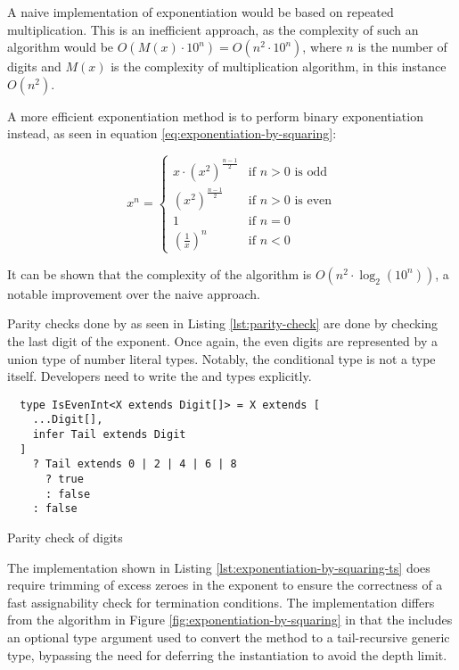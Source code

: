 A naive implementation of exponentiation would be based on repeated multiplication. This is an inefficient approach, as the complexity of such an algorithm would be $O(M(x) \cdot 10^n) = O(n^2 \cdot 10^n)$, where $n$ is the number of digits and $M(x)$ is the complexity of multiplication algorithm, in this instance $O(n^2)$.

A more efficient exponentiation method is to perform binary exponentiation instead, as seen in equation \ref{eq:exponentiation-by-squaring}:

\begin{equation}\label{eq:exponentiation-by-squaring}
  x^n =
  \begin{cases}
    x \cdot (x^2)^\frac{n-1}{2} & \text{if } n > 0 \text{ is odd}  \\
    (x^2)^\frac{n-1}{2}         & \text{if } n > 0 \text{ is even} \\
    1                           & \text{if } n = 0                 \\
    (\frac{1}{x})^n             & \text{if } n < 0
  \end{cases}
\end{equation}

It can be shown that the complexity of the algorithm is $O(n^2 \cdot \log_2(10^n))$, a notable improvement over the naive approach.

Parity checks done by  as seen in Listing \ref{lst:parity-check} are done by checking the last digit of the exponent. Once again, the even digits are represented by a union type of number literal types. Notably, the conditional type is not a type itself. Developers need to write the  and  types explicitly.

\begin{listing}[ht]
  \begin{verbatim}
  type IsEvenInt<X extends Digit[]> = X extends [
    ...Digit[],
    infer Tail extends Digit
  ]
    ? Tail extends 0 | 2 | 4 | 6 | 8
      ? true
      : false
    : false
  \end{verbatim}
  \caption{Parity check of digits}\label{lst:parity-check}
\end{listing}

The implementation shown in Listing \ref{lst:exponentiation-by-squaring-ts} does require trimming of excess zeroes in the exponent to ensure the correctness of a fast assignability check for termination conditions. The implementation differs from the algorithm in Figure \ref{fig:exponentiation-by-squaring} in that the  includes an optional type argument  used to convert the method to a tail-recursive generic type, bypassing the need for deferring the instantiation to avoid the depth limit.

